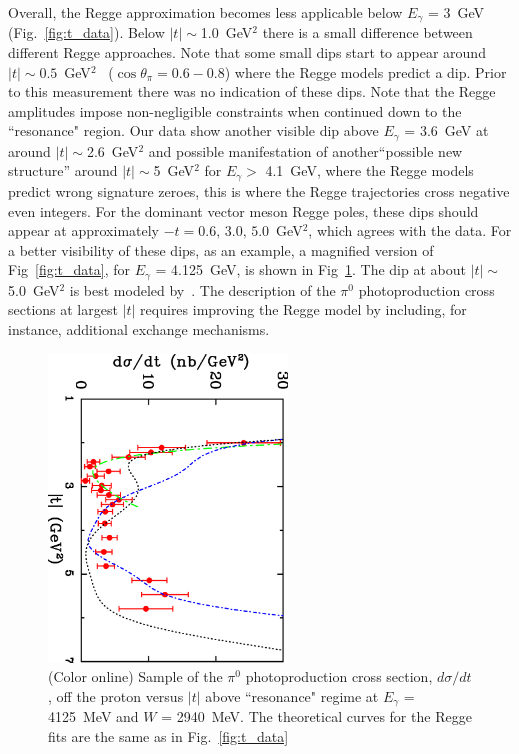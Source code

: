 \documentclass[aps,prc,twocolumn,floatfix,showpacs,preprintnumbers,amsmath,amssymb,superscriptaddress,linenumbers]{revtex4-1}
\begin{document}
Overall, the Regge approximation 
becomes less applicable below $E_{\gamma}$ = 3~GeV (Fig.~\ref{fig:t_data}). 
Below $|t|\sim$1.0~GeV$^2$ there is a small difference between 
different Regge approaches.    
Note that some small dips start to appear around $|t| \sim 0.5$~GeV$^2$
~($\cos \theta_{\pi} = 0.6-0.8$) where the Regge models predict a dip.  
Prior to this measurement there was no indication of these dips.
Note that the Regge amplitudes impose non-negligible constraints when continued down to the 
``resonance" region.
Our data show another visible dip above $E_{\gamma}$ = 3.6~GeV at around $|t|\sim$2.6~GeV$^2$ and possible manifestation of another``possible new structure'' around $|t|\sim$5~GeV$^2$ for $E_{\gamma} >$ 4.1~GeV, where the Regge models~\cite{Goldstein:1973xn,
Laget:2005be,Donnachie:2015jaa} predict wrong signature zeroes, 
this is where the Regge trajectories cross negative even integers. 
For the dominant vector meson Regge poles, these dips should appear 
at approximately $-t=0.6, \, 3.0, \, 5.0$~GeV$^2$,  which agrees 
with the data. For a better visibility of these dips, as an example, a magnified version of Fig~\ref{fig:t_data}, for $E_\gamma$ = 4.125~GeV, is shown in Fig~\ref{fig:t_dataB}. 
The dip at about $|t|\sim$5.0~GeV$^2$ is best modeled by~\cite{Goldstein:1973xn}. 
The description of the $\pi^0$ photoproduction 
cross sections at largest $\vert t \vert$ requires improving the 
Regge model by including, for instance, additional exchange mechanisms.
\begin{figure}[htb!]
	\centerline{
		\includegraphics[width=2.5in, angle=90]{dsdtB.eps}}
	\caption {(Color online) Sample of the $\pi^0$ photoproduction 
		cross section, $d\sigma/dt$, off the proton versus $|t|$ 
		above ``resonance" regime at $E_{\gamma}$ = 4125~MeV and $W$ = 2940~MeV.
		The theoretical curves for the Regge 
		fits are the same as in Fig.~\protect\ref{fig:t_data} }
	\label{fig:t_dataB}
\end{figure}
\FloatBarrier
\end{document}

